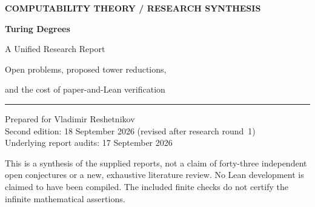\documentclass[11pt,a4paper]{article}
\theoremstyle{definition}\newtheorem{definition}[theorem]{Definition}
\theoremstyle{remark}\newtheorem{remark}[theorem]{Remark}
\begin{document}
\begin{titlepage}
\vspace*{13mm}
{\small\sffamily\bfseries\color{navy}COMPUTABILITY THEORY \quad / \quad RESEARCH SYNTHESIS\par}
\vspace{15mm}
{\Huge\bfseries\color{navy}Turing Degrees\par}
\vspace{6mm}
{\LARGE A Unified Research Report\par}
\vspace{9mm}
{\large Open problems, proposed tower reductions,\par
and the cost of paper-and-Lean verification\par}
\vspace{15mm}
\noindent\rule{\textwidth}{0.5pt}
\vspace{5mm}
\noindent Prepared for Vladimir Reshetnikov\\[3pt]
Second edition: 18 September 2026 (revised after research round~1)\\
Underlying report audits: 17 September 2026
\vspace{12mm}
\begin{abstract}
Three research reports are integrated into one catalogue of open topics and three separately identified bounded research programmes. This second edition follows a first round of nine research reports, all of which attacked the coarse least-representative question C1. That question is settled negatively---the answer already followed from published work---and it has been removed from the list of targets; its results are recorded in the separate synthesis \cite{Synthesis}. Five follow-on topics C4--C8 arising from that round have been added, the effective-dense question C2 has been re-triaged, and the catalogue now has forty-three topics. A new context section relates the degrees to large countable ordinals and to large cardinals. Shared definitions, feasibility assessments, source records, and formalization requirements are consolidated; distinct variants are retained rather than silently identified. The most consequential difference between the inputs concerns towers: one report proposes elementary strong reductions under explicit computable-column conventions, while another treats the same comparisons as transformation-search targets. We preserve the complete proposed proofs and their diagnostic lemmas, but separate mathematical claims under those conventions from external acceptance, novelty, and the interpretation of the published questions. The report also combines metric geometry, coarse and effective-dense representatives, local oracle classes, lattice spectra, categoricity, randomness, dimension, and global structure. A unified Lean audit distinguishes inherited source inspection from successful compilation, and a crosswalk accounts for every original numbered entry.
\end{abstract}
\vfill
\noindent\small This is a synthesis of the supplied reports, not a claim of forty-three independent open conjectures or a new, exhaustive literature review. No Lean development is claimed to have been compiled. The included finite checks do not certify the infinite mathematical assertions.
\end{titlepage}
\end{document}
